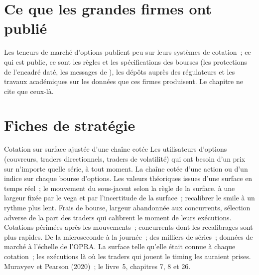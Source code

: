 \section{Ce que les grandes firmes ont publié}

Les teneurs de marché d'options publient peu sur leurs systèmes de cotation~; ce qui est public, ce sont les règles et les spécifications des bourses (les protections de
l'encadré daté, les messages de ), les dépôts auprès des régulateurs et les travaux académiques sur les données que ces firmes produisent. Le chapitre ne cite que ceux-là.

\section{Fiches de stratégie}

\begin{strategyfile}{Cotation sur surface ajustée d'une chaîne cotée}\label{strat:hf:automated-options-market-making:surface}
 Les utilisateurs d'options (couvreurs, traders directionnels, traders de volatilité) qui ont besoin d'un prix sur n'importe quelle série, à tout moment.
 La chaîne cotée d'une action ou d'un indice sur chaque bourse d'options.
 Les valeurs théoriques issues d'une surface en temps réel~; le mouvement du sous-jacent selon la règle de la surface.
  à une largeur fixée par le vega et par l'incertitude de la surface~; recalibrer le smile à un rythme plus lent.
 Frais de bourse, largeur abandonnée aux concurrents, sélection adverse de la part des traders qui calibrent le moment de leurs exécutions.
 Cotations périmées après les mouvements~; concurrents dont les recalibrages sont plus rapides.
 De la microseconde à la journée~; des milliers de séries~; données de marché à l'échelle de l'OPRA.
 La surface telle qu'elle était connue à chaque cotation~; les exécutions là où les traders qui jouent le timing les auraient prises.
 Muravyev et Pearson (2020)~; le livre~5, chapitres 7, 8 et 26.
\end{strategyfile}

